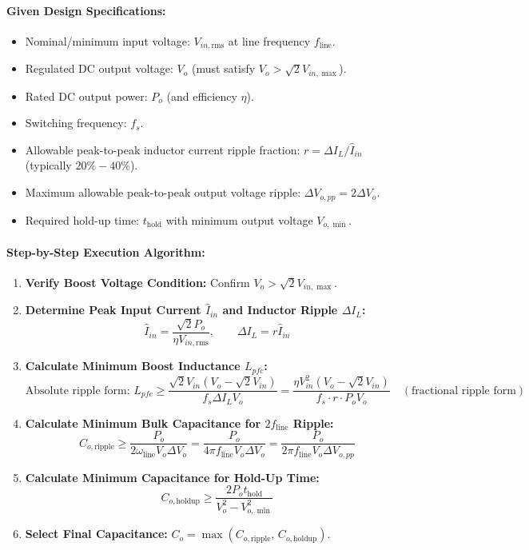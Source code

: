 \paragraph{Given Design Specifications:}
\begin{itemize}
  \item Nominal/minimum input voltage: $V_{in,\mathrm{rms}}$ at line frequency $f_{\mathrm{line}}$.
  \item Regulated DC output voltage: $V_o$ (must satisfy $V_o > \sqrt{2} V_{in,\max}$).
  \item Rated DC output power: $P_o$ (and efficiency $\eta$).
  \item Switching frequency: $f_s$.
  \item Allowable peak-to-peak inductor current ripple fraction: $r = \Delta I_L / \hat{I}_{in}$ (typically $20\% - 40\%$).
  \item Maximum allowable peak-to-peak output voltage ripple: $\Delta V_{o,pp} = 2\Delta V_o$.
  \item Required hold-up time: $t_{\mathrm{hold}}$ with minimum output voltage $V_{o,\min}$.
\end{itemize}

\paragraph{Step-by-Step Execution Algorithm:}
\begin{enumerate}
  \item \textbf{Verify Boost Voltage Condition:} Confirm $V_o > \sqrt{2} V_{in,\max}$.
  \item \textbf{Determine Peak Input Current $\hat{I}_{in}$ and Inductor Ripple $\Delta I_L$:}
  \[
  \hat{I}_{in} = \frac{\sqrt{2} P_o}{\eta V_{in,\mathrm{rms}}}, \qquad \Delta I_L = r \hat{I}_{in}
  \]
  \item \textbf{Calculate Minimum Boost Inductance $L_{pfc}$:}
  \[
  \text{Absolute ripple form: } L_{pfc} \ge \frac{\sqrt{2} V_{in}(V_o - \sqrt{2} V_{in})}{f_s \Delta I_L V_o} = \frac{\eta V_{in}^2 (V_o - \sqrt{2} V_{in})}{f_s \cdot r \cdot P_o V_o} \quad (\text{fractional ripple form})
  \]
  \item \textbf{Calculate Minimum Bulk Capacitance for $2 f_{\mathrm{line}}$ Ripple:}
  \[
  C_{o,\mathrm{ripple}} \ge \frac{P_o}{2\omega_{\mathrm{line}} V_o \Delta V_o} = \frac{P_o}{4\pi f_{\mathrm{line}} V_o \Delta V_o} = \frac{P_o}{2\pi f_{\mathrm{line}} V_o \Delta V_{o,pp}}
  \]
  \item \textbf{Calculate Minimum Capacitance for Hold-Up Time:}
  \[
  C_{o,\mathrm{holdup}} \ge \frac{2 P_o t_{\mathrm{hold}}}{V_o^2 - V_{o,\min}^2}
  \]
  \item \textbf{Select Final Capacitance:} $C_o = \max\left(C_{o,\mathrm{ripple}},\, C_{o,\mathrm{holdup}}\right)$.
\end{enumerate}

